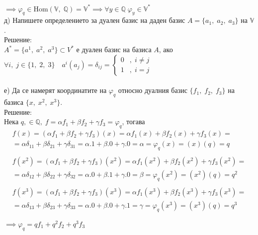\documentclass[12pt]{article}
\newcommand{\Q}{\mathbb{Q}}
\newcommand{\V}{\mathbb{V}}
\begin{document}
$\implies \varphi_q \in \mathrm{Hom}(\V, \; \Q) = \V^* \implies \forall y \in \Q \; \varphi_y \in \V^*$ \\

д) Напишете определението за дуален базис на даден базис $A = \{a_1, \; a_2, \; a_3\}$ на $\V$. \\

Решение: \\

$A^* = \{a^1, \; a^2, \; a^3\} \subset V^*$ е дуален базис на базиса $A$, ако \\

$\forall i, \; j \in \{1, \; 2, \; 3\} \quad a^i(a_j) = \delta_{ij} = \begin{cases}
    0 & , \; i \neq j \\
    1 & , \; i = j
\end{cases}$ \\\\

е) Да се намерят координатите на $\varphi_q$ относно дуалния базис
$\{f_1, \; f_2, \; f_3\}$ на базиса $\{x, \; x^2, \; x^3\}$. \\

Решение: \\

Нека $q, \in \Q, \; f = \alpha f_1 + \beta f_2 + \gamma f_3 = \varphi_q$, тогава
\begin{align*}
    f(x) = (\alpha f_1 + \beta f_2 + \gamma f_3)(x) = \alpha f_1(x) + \beta f_2(x) + \gamma f_3(x) = \\
    = \alpha\delta_{11} + \beta\delta_{21} + \gamma\delta_{31} = \alpha.1 + \beta.0 + \gamma.0 = \alpha = \varphi_q(x) = (x)(q) = q \\\\
    f(x^2) = (\alpha f_1 + \beta f_2 + \gamma f_3)(x^2) = \alpha f_1(x^2) + \beta f_2(x^2) + \gamma f_3(x^2) = \\
    = \alpha\delta_{12} + \beta\delta_{22} + \gamma\delta_{32} = \alpha.0 + \beta.1 + \gamma.0 = \beta = \varphi_q(x^2) = (x^2)(q) = q^2 \\\\
    f(x^3) = (\alpha f_1 + \beta f_2 + \gamma f_3)(x^3) = \alpha f_1(x^3) + \beta f_2(x^3) + \gamma f_3(x^3) = \\
    = \alpha\delta_{13} + \beta\delta_{23} + \gamma\delta_{33} = \alpha.0 + \beta.0 + \gamma.1 = \gamma = \varphi_q(x^3) = (x^3)(q) = q^3
\end{align*}

$\implies \varphi_q = qf_1 + q^2f_2 + q^3f_3$ \\
\end{document}
